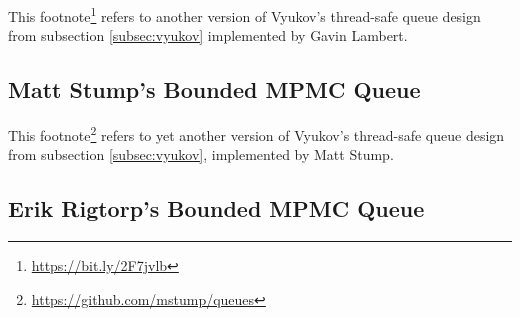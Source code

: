 	This footnote\footnote{\url{https://bit.ly/2F7jvlb}} refers to another version of Vyukov's thread-safe queue design from subsection \ref{subsec:vyukov} implemented by Gavin Lambert.

%
%	
%	
%
\subsection[Matt Stump's MPMC Queue]{Matt Stump's Bounded MPMC Queue} \label{subsec:vyukov-variation}

	This footnote\footnote{\url{https://github.com/mstump/queues}} refers to yet another version of Vyukov's thread-safe queue design from subsection \ref{subsec:vyukov}, implemented by Matt Stump.

\subsection[Erik Rigtorp's MPMC Queue]{Erik Rigtorp's Bounded MPMC Queue} \label{subsec:rigtorp}

